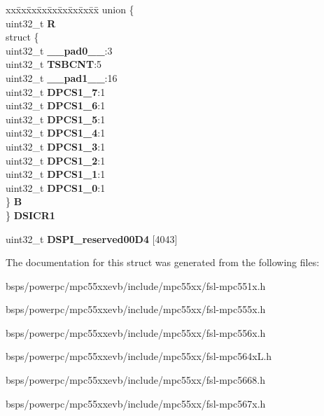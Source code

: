\begin{DoxyCompactItemize}
\begin{tabbing}
\end{tabbing}\item 
\mbox{\label{structDSPI__tag_ad35c83a9a30051084f989d4111f684b3}} 
\begin{tabbing}
xx\=xx\=xx\=xx\=xx\=xx\=xx\=xx\=xx\=\kill
union \{\\
\>uint32\_t {\bfseries R}\\
\>struct \{\\
\>\>uint32\_t {\bfseries \_\_pad0\_\_}:3\\
\>\>uint32\_t {\bfseries TSBCNT}:5\\
\>\>uint32\_t {\bfseries \_\_pad1\_\_}:16\\
\>\>uint32\_t {\bfseries DPCS1\_7}:1\\
\>\>uint32\_t {\bfseries DPCS1\_6}:1\\
\>\>uint32\_t {\bfseries DPCS1\_5}:1\\
\>\>uint32\_t {\bfseries DPCS1\_4}:1\\
\>\>uint32\_t {\bfseries DPCS1\_3}:1\\
\>\>uint32\_t {\bfseries DPCS1\_2}:1\\
\>\>uint32\_t {\bfseries DPCS1\_1}:1\\
\>\>uint32\_t {\bfseries DPCS1\_0}:1\\
\>\} {\bfseries B}\\
\} {\bfseries DSICR1}\\

\end{tabbing}\item 
\mbox{\label{structDSPI__tag_a09d4f5c5d5615d2e8991043c62ee1a2e}} 
uint32\+\_\+t {\bfseries D\+S\+P\+I\+\_\+reserved00\+D4} \mbox{[}4043\mbox{]}
\end{DoxyCompactItemize}


The documentation for this struct was generated from the following files\+:\begin{DoxyCompactItemize}
\item 
bsps/powerpc/mpc55xxevb/include/mpc55xx/fsl-\/mpc551x.\+h\item 
bsps/powerpc/mpc55xxevb/include/mpc55xx/fsl-\/mpc555x.\+h\item 
bsps/powerpc/mpc55xxevb/include/mpc55xx/fsl-\/mpc556x.\+h\item 
bsps/powerpc/mpc55xxevb/include/mpc55xx/fsl-\/mpc564x\+L.\+h\item 
bsps/powerpc/mpc55xxevb/include/mpc55xx/fsl-\/mpc5668.\+h\item 
bsps/powerpc/mpc55xxevb/include/mpc55xx/fsl-\/mpc567x.\+h\end{DoxyCompactItemize}
